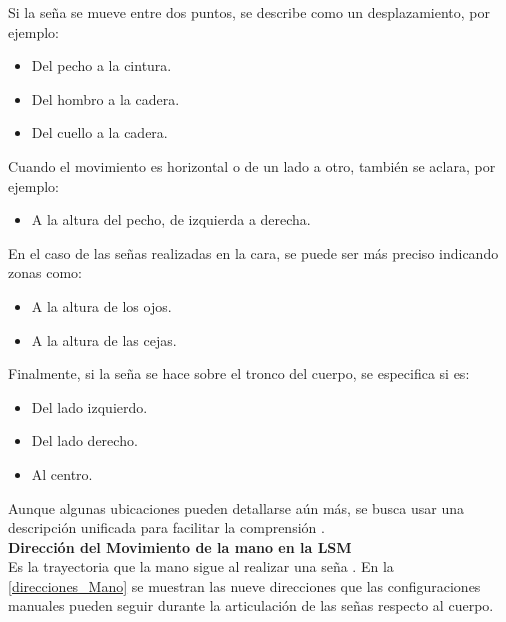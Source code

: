 Si la seña se mueve entre dos puntos, se describe como un desplazamiento, por ejemplo:

\begin{itemize}
    \item Del pecho a la cintura.
    \item Del hombro a la cadera.
    \item Del cuello a la cadera.
\end{itemize}

Cuando el movimiento es horizontal o de un lado a otro, también se aclara, por ejemplo:
\begin{itemize}
    \item A la altura del pecho, de izquierda a derecha.
\end{itemize}

En el caso de las señas realizadas en la cara, se puede ser más preciso indicando zonas como:
\begin{itemize}
    \item A la altura de los ojos.
    \item A la altura de las cejas.    
\end{itemize}

Finalmente, si la seña se hace sobre el tronco del cuerpo, se especifica si es:
\begin{itemize}
    \item Del lado izquierdo.
    \item Del lado derecho.
    \item Al centro.
\end{itemize}

Aunque algunas ubicaciones pueden detallarse aún más, se busca usar una descripción unificada para facilitar la comprensión \cite{ref37}.\\

\textbf{Dirección del Movimiento de la mano en la LSM}\\
Es la trayectoria que la mano sigue al realizar una seña \cite{ref37}. En la \autoref{direcciones_Mano} se muestran las nueve direcciones que las configuraciones manuales pueden seguir durante la articulación de las señas respecto al cuerpo.

